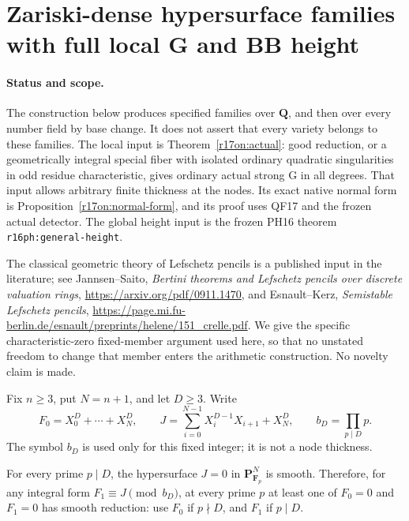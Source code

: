 \section{Zariski-dense hypersurface families with full local G and BB height}
\label{r17gp:section}

\paragraph{Status and scope.}
The construction below produces specified families over $\mathbf Q$,
and then over every number field by base change. It does not assert
that every variety belongs to these families. The local input is
Theorem~\ref{r17on:actual}: good reduction, or a geometrically integral
special fiber with isolated ordinary quadratic singularities in odd
residue characteristic, gives ordinary actual strong G in all degrees.
That input allows arbitrary finite thickness at the nodes. Its exact
native normal form is Proposition~\ref{r17on:normal-form}, and its
proof uses QF17 and the frozen actual detector. The global height input
is the frozen PH16 theorem \texttt{r16ph:general-height}.

The classical geometric theory of Lefschetz pencils is a published
input in the literature; see Jannsen--Saito,
\emph{Bertini theorems and Lefschetz pencils over discrete valuation
rings}, \url{https://arxiv.org/pdf/0911.1470}, and
Esnault--Kerz, \emph{Semistable Lefschetz pencils},
\url{https://page.mi.fu-berlin.de/esnault/preprints/helene/151_crelle.pdf}.
We give the specific characteristic-zero fixed-member argument used
here, so that no unstated freedom to change that member enters the
arithmetic construction. No novelty claim is made.

Fix $n\ge3$, put $N=n+1$, and let $D\ge3$. Write
\[
 F_0=X_0^D+\cdots+X_N^D,\qquad
 J=\sum_{i=0}^{N-1}X_i^{D-1}X_{i+1}+X_N^D,
 \qquad b_D=\prod_{p\mid D}p.
 \tag{GP17.1}\label{r17gp:polynomials}
\]
The symbol $b_D$ is used only for this fixed integer; it is not a
node thickness.

\begin{lemma}
\label{r17gp:chain}
For every prime $p\mid D$, the hypersurface $J=0$ in
$\mathbf P^N_{\mathbf F_p}$ is smooth. Therefore, for any integral
form $F_1\equiv J\pmod{b_D}$, at every prime $p$ at least one
of $F_0=0$ and $F_1=0$ has smooth reduction: use $F_0$ if
$p\nmid D$, and $F_1$ if $p\mid D$.
\end{lemma}

